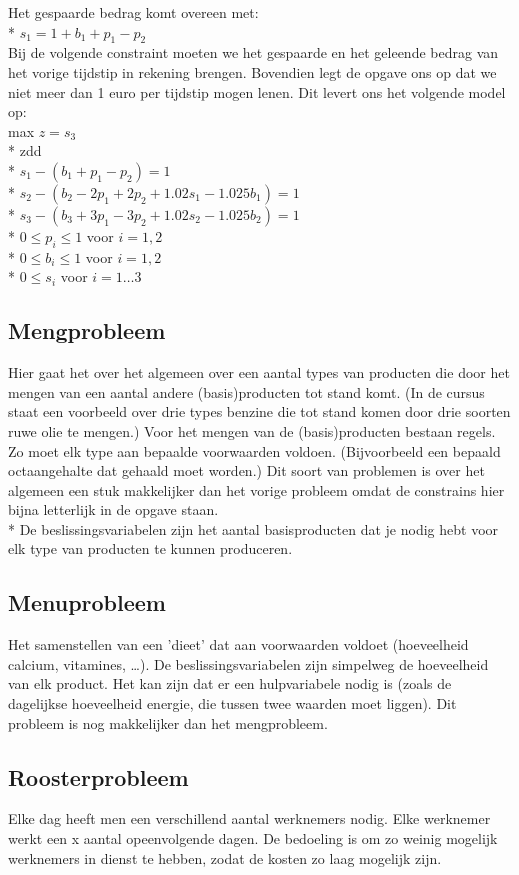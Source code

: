 \documentclass[10pt]{article}
\begin{document}
Het gespaarde bedrag komt overeen met:\\*
$s_1 = 1+b_1+p_1-p_2$\\
Bij de volgende constraint moeten we het gespaarde en het geleende bedrag van het vorige tijdstip in rekening brengen. Bovendien legt de opgave ons op dat we niet meer dan 1 euro per tijdstip mogen lenen. Dit levert ons het volgende model op:\\
max $z = s_3$\\*
zdd\\*
$s_1-(b_1+p_1-p_2) = 1$\\*
$s_2-(b_2-2p_1+2p_2+1.02s_1-1.025b_1) = 1$\\*
$s_3-(b_3+3p_1-3p_2+1.02s_2-1.025b_2) = 1$\\*
$0 \le p_i \le 1$ voor $i = 1,2$\\*
$0 \le b_i \le 1$ voor $i = 1,2$\\*
$0 \le s_i$ voor $i = 1\dots3$
\subsection{Mengprobleem}
Hier gaat het over het algemeen over een aantal types van producten die door het mengen van een aantal andere (basis)producten tot stand komt. (In de cursus staat een voorbeeld over drie types benzine die tot stand komen door drie soorten ruwe olie te mengen.) Voor het mengen van de (basis)producten bestaan regels. Zo moet elk type aan bepaalde voorwaarden voldoen. (Bijvoorbeeld een bepaald octaangehalte dat gehaald moet worden.) Dit soort van problemen is over het algemeen een stuk makkelijker dan het vorige probleem omdat de constrains hier bijna letterlijk in de opgave staan.\\*
De beslissingsvariabelen zijn het aantal basisproducten dat je nodig hebt voor elk type van producten te kunnen produceren.
\subsection{Menuprobleem}
Het samenstellen van een 'dieet' dat aan voorwaarden voldoet (hoeveelheid calcium, vitamines, \dots). De beslissingsvariabelen zijn simpelweg de hoeveelheid van elk product. Het kan zijn dat er een hulpvariabele nodig is (zoals de dagelijkse hoeveelheid energie, die tussen twee waarden moet liggen). Dit probleem is nog makkelijker dan het mengprobleem.
\subsection{Roosterprobleem}
Elke dag heeft men een verschillend aantal werknemers nodig. Elke werknemer werkt een x aantal opeenvolgende dagen. De bedoeling is om zo weinig mogelijk werknemers in dienst te hebben, zodat de kosten zo laag mogelijk zijn.
\end{document}
